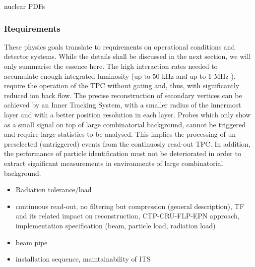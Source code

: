 nuclear PDFs

\subsubsection{Requirements}
\label{sec:physics_motivation}

These physics goals translate to requirements on operational conditions and detector systems. While the details shall be discussed in the next section, we will only summarise the essence here. The high interaction rates needed to accumulate enough integrated luminosity (up to 50 kHz \PbPb{} and up to 1 MHz \pp{}), require the operation of the TPC without gating and, thus, with significantly reduced ion back flow. The precise reconstruction of secondary vertices can be achieved by an Inner Tracking System, with a smaller radius of the innermost layer and with a better position resolution in each layer. Probes which only show as a small signal on top of large combinatorial background, cannot be triggered and require large statistics to be analysed. This implies the processing of un-preselected (untriggered) events from the continuosly read-out TPC. In addition, the performance of particle identification must not be deteriorated in order to extract significant measurements in environments of large combinatorial background.



\begin{itemize}
\item Radiation tolerance/load
\item continuous read-out, no filtering but compression (general description), TF and its related impact on reconstruction, CTP-CRU-FLP-EPN approach, implementation specification (beam, particle load, radiation load)
\item beam pipe
\item installation sequence, maintainability of ITS
\end{itemize}
